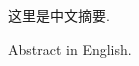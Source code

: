 \begin{cabstract}
    这里是中文摘要.
\end{cabstract}


\begin{eabstract}
    Abstract in English.
\end{eabstract}

